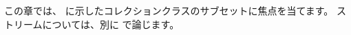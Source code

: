\documentclass[a4paper,10pt,twoside]{book}
\begin{document}



この章では、 に示したコレクションクラスのサブセットに焦点を当てます。
ストリームについては、別に  で論じます。


\end{document}
